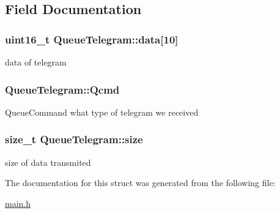 \subsection{Field Documentation}
\hypertarget{struct_queue_telegram_a43b68c4a7f4cee5a8ff61cfe38efc716}{
\subsubsection[{data}]{\setlength{\rightskip}{0pt plus 5cm}uint16\+\_\+t Queue\+Telegram\+::data\mbox{[}10\mbox{]}}}\label{struct_queue_telegram_a43b68c4a7f4cee5a8ff61cfe38efc716}
data of telegram \hypertarget{struct_queue_telegram_a752eb6858a0e18355371dc6cdc559e64}{
\subsubsection[{Qcmd}]{ Queue\+Telegram\+::\+Qcmd}}\label{struct_queue_telegram_a752eb6858a0e18355371dc6cdc559e64}
Queue\+Command what type of telegram we received \hypertarget{struct_queue_telegram_a5adaf2ba7c2db4f8f198143783d09db3}{
\subsubsection[{size}]{\setlength{\rightskip}{0pt plus 5cm}size\+\_\+t Queue\+Telegram\+::size}}\label{struct_queue_telegram_a5adaf2ba7c2db4f8f198143783d09db3}
size of data transmited 

The documentation for this struct was generated from the following file\+:\begin{DoxyCompactItemize}
\item 
\hyperlink{main_8h}{main.\+h}\end{DoxyCompactItemize}
